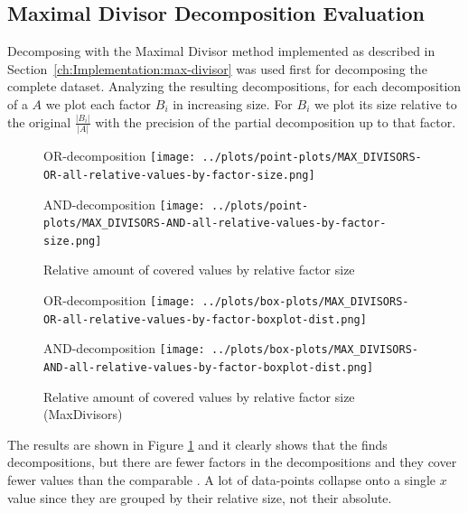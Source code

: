 \subsection{Maximal Divisor Decomposition Evaluation}
\label{ch:Evaluation:decomposition-quality:max-divisor}
Decomposing with the Maximal Divisor method implemented as described in Section~\ref{ch:Implementation:max-divisor} was used first for decomposing the complete dataset.
Analyzing the resulting decompositions, for each decomposition of a \DFA $A$ we plot each factor $B_i$ in increasing size.
For $B_i$ we plot its size relative to the original \DFA $\frac{|B_i|}{|A|}$ with the precision of the partial decomposition up to that factor.
\begin{figure}[h]
	\begin{minipage}[h]{0.49\linewidth}
		\centering
		OR-decomposition
		\texttt{[image: ../plots/point-plots/MAX\_DIVISORS-OR-all-relative-values-by-factor-size.png]}
	\end{minipage}
	\begin{minipage}[h]{0.49\linewidth}
		\centering
		AND-decomposition
		\texttt{[image: ../plots/point-plots/MAX\_DIVISORS-AND-all-relative-values-by-factor-size.png]}
	\end{minipage}
	\caption{Relative amount of covered values by relative factor size}
	\label{fig:eval:max-divisor-all-factors}
\end{figure}
\begin{figure}[t]
	\begin{minipage}[h]{0.49\linewidth}
		\centering
		OR-decomposition
		\texttt{[image: ../plots/box-plots/MAX\_DIVISORS-OR-all-relative-values-by-factor-boxplot-dist.png]}
	\end{minipage}
	\begin{minipage}[h]{0.49\linewidth}
		\centering
		AND-decomposition
		\texttt{[image: ../plots/box-plots/MAX\_DIVISORS-AND-all-relative-values-by-factor-boxplot-dist.png]}
	\end{minipage}
	\caption{Relative amount of covered values by relative factor size (MaxDivisors)}
	\label{fig:eval:max-divisor-all-factors-box-plot}
\end{figure}
The results are shown in Figure \ref{fig:eval:max-divisor-all-factors} and it clearly shows that the \orDecomp finds decompositions, but there are fewer factors in the decompositions and they cover fewer values than the comparable \andDecomp.
A lot of data-points collapse onto a single $x$ value since they are grouped by their relative size, not their absolute.

